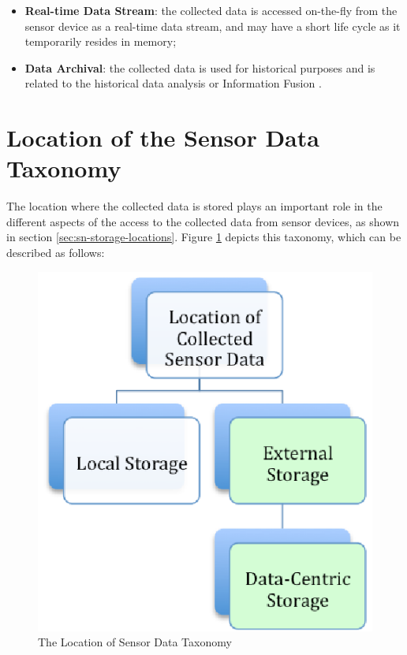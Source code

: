 \begin{itemize}
  \item \textbf{Real-time Data Stream}: the collected data is accessed
  on-the-fly from the sensor device as a real-time data stream, and may have a
  short life cycle as it temporarily resides in memory;
  \item \textbf{Data Archival}: the collected data is used for historical
  purposes and is related to the historical data analysis \cite{sn-intro01,
  sn-intro02} or Information Fusion \cite{sn-info-fusion}. 
\end{itemize}

\section{Location of the Sensor Data Taxonomy}

The location where the collected data is stored plays an important role
in the different aspects of the access to the collected data from sensor
devices, as shown in section \ref{sec:sn-storage-locations}. Figure 
\ref{fig:taxonomy-data-location} depicts this taxonomy, which can be
described as follows:

\begin{figure}[h]
  \centering
  \includegraphics{../diagrams/taxonomy-data-location}
  \caption{The Location of Sensor Data Taxonomy}
  \label{fig:taxonomy-data-location}
\end{figure}

